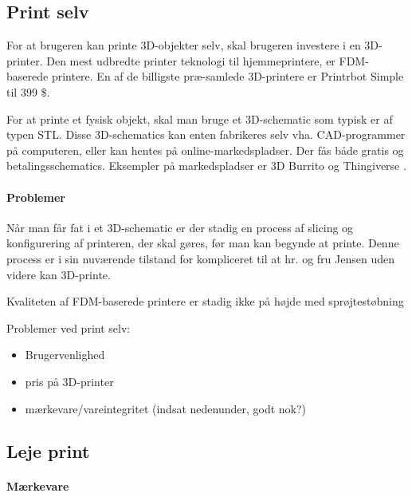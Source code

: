 \subsection{Print selv} %
\label{sub:print_selv}


For at brugeren kan printe 3D-objekter selv, skal brugeren investere i en 3D-printer. Den mest udbredte printer teknologi til hjemmeprintere, er FDM-baserede printere. En af de billigste præ-samlede 3D-printere er Printrbot Simple til 399 \$. \autocite{_assembled_????}

For at printe et fysisk objekt, skal man bruge et 3D-schematic som typisk er af typen STL. Disse 3D-schematics kan enten fabrikeres selv vha. CAD-programmer på computeren, eller kan hentes på online-markedspladser. Der fås både gratis og betalingsschematics. Eksempler på markedspladser er 3D Burrito \autocite{_3d_2013-1} og Thingiverse \autocite{_thingiverse_????}.


\paragraph{Problemer} %
\label{par:problemer_mangler}

Når man får fat i et 3D-schematic er der stadig en process af slicing og konfigurering af printeren, der skal gøres, før man kan begynde at printe. Denne process er i sin nuværende tilstand for kompliceret til at hr. og fru Jensen uden videre kan 3D-printe.

Kvaliteten af FDM-baserede printere er stadig ikke på højde med sprøjtestøbning




Problemer ved print selv:

\begin{itemize}
	\item Brugervenlighed
	\item pris på 3D-printer
	\item mærkevare/vareintegritet (indsat nedenunder, godt nok?)
\end{itemize}

\subsection{Leje print} %
\label{sub:leje_print}


\paragraph{Mærkevare}

